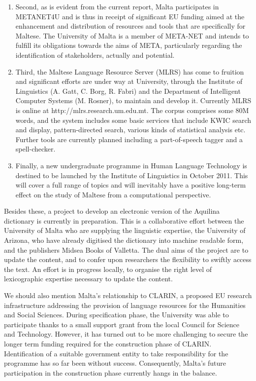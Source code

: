 \documentclass[]{../../metanetpaper}
\begin{document}
\begin{multicols}{2}
\begin{enumerate}
\item Second, as is evident from the current report, Malta participates in METANET4U and is thus in receipt of significant EU funding aimed at the enhancement and distribution of resources and tools that are specifically for Maltese. The University of Malta is a member of META-NET and intends to fulfill its obligations towards the aims of META, particularly regarding the identification of stakeholders, actually and potential. 

\item Third, the Maltese Language Resource Server (MLRS) has come to fruition and significant efforts are under way at University, through the Institute of Linguistics (A. Gatt, C. Borg, R. Fabri) and the Department of Intelligent Computer Systems (M. Rosner), to maintain and develop it. Currently MLRS is online at http://mlrs.research.um.edu.mt. The corpus comprises some 80M words, and the system includes some basic services that include KWIC search and display, pattern-directed search, various kinds of statistical analysis etc. Further tools are currently planned including a part-of-speech tagger and a spell-checker.

\item Finally, a new undergraduate programme in Human Language Technology is destined to be launched by the Institute of Linguistics in October 2011. This will cover a full range of topics and will inevitably have a positive long-term effect on the study of Maltese from a computational perspective.
\end{enumerate}

Besides these, a project to develop an electronic version of the Aquilina dictionary \cite{Aquilina:1987,Aquilina:1990} is currently in preparation. This is a collaborative effort between the University of Malta who are supplying the linguistic expertise, the University of Arizona, who have already digitised the dictionary into machine readable form, and the publishers Midsea Books of Valletta. The dual aims of the project are to update the content, and to confer upon researchers the flexibility to swiftly access the text. An effort is in progress locally, to organise the right level of lexicographic expertise necessary to update the content.

We should also mention Malta’s relationship to CLARIN, a proposed EU research infrastructure addressing the provision of language resources for the Humanities and Social Sciences. During specification phase, the University was able to participate thanks to a small support grant from the local Council for Science and Technology. However, it has turned out to be more challenging to secure the longer term funding required for the construction phase of CLARIN. Identification of a suitable government entity to take responsibility for the programme has so far been without success. Consequently, Malta’s future participation in the construction phase currently hangs in the balance.
  

\end{multicols}
\end{document}
